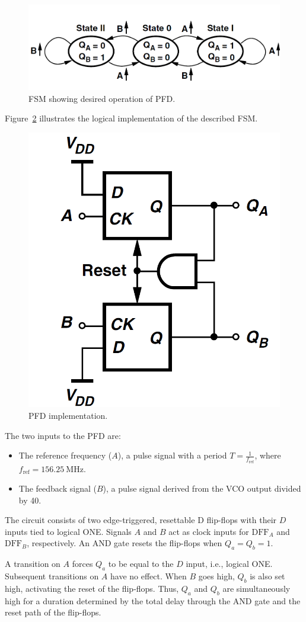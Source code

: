 \documentclass[lettersize,journal]{IEEEtran}
\begin{document}
\begin{figure}[!h]
    \centering
    \includegraphics[width=0.75\linewidth]{images/block_design/PFD/PFD_FSM.png}
    \caption{FSM showing desired operation of PFD.}
    \label{fig:PFD_FSM}
\end{figure}

Figure~\ref{fig:PFD} illustrates the logical implementation of the described FSM. 

\begin{figure}[!h]
    \centering
    \includegraphics[width=0.4\linewidth]{images/block_design/PFD/PFD.png}
    \caption{PFD implementation.}
    \label{fig:PFD}
\end{figure}

The two inputs to the PFD are:
\begin{itemize}
    \item The reference frequency (\( A \)), a pulse signal with a period \( T = \frac{1}{f_{\text{ref}}} \), where \( f_{\text{ref}} = 156.25~\mathrm{MHz} \).
    \item The feedback signal (\( B \)), a pulse signal derived from the VCO output divided by 40.
\end{itemize}

The circuit consists of two edge-triggered, resettable D flip-flops with their \( D \) inputs tied to logical ONE. Signals \( A \) and \( B \) act as clock inputs for \( \text{DFF}_A \) and \( \text{DFF}_B \), respectively. An AND gate resets the flip-flops when \( Q_a = Q_b = 1 \).

A transition on \( A \) forces \( Q_a \) to be equal to the \( D \) input, i.e., logical ONE. Subsequent transitions on \( A \) have no effect. When \( B \) goes high, \( Q_b \) is also set high, activating the reset of the flip-flops. Thus, \( Q_a \) and \( Q_b \) are simultaneously high for a duration determined by the total delay through the AND gate and the reset path of the flip-flops.
\end{document}
